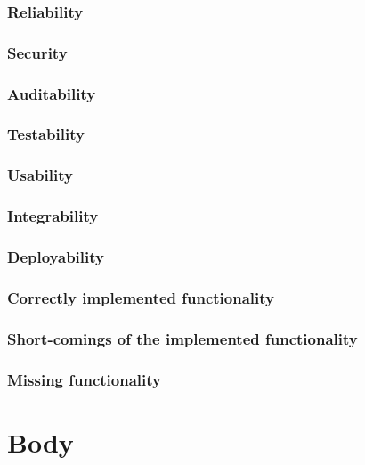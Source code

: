 \documentclass{article}
\begin{document}
        \subsubsection{Reliability}
        \subsubsection{Security}
        \subsubsection{Auditability}
        \subsubsection{Testability}
        \subsubsection{Usability}
        \subsubsection{Integrability}
        \subsubsection{Deployability}
        \subsubsection{Correctly implemented functionality}
        \subsubsection{Short-comings of the implemented functionality}
        \subsubsection{Missing functionality}
\newpage
\section{Body}
\lipsum[1]
\end{document}
